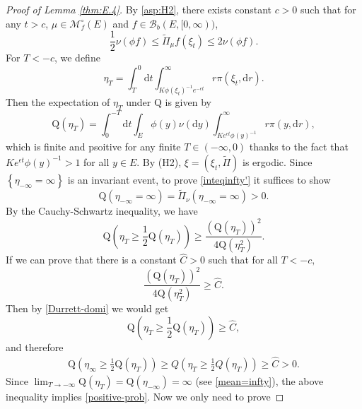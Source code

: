 \documentclass[12pt,a4paper]{amsart}
\numberwithin{equation}{section}
\theoremstyle{plain}
\theoremstyle{definition}
\theoremstyle{remark}
\begin{document}
\begin{proof}[Proof of Lemma \ref{thm:E.4}]
By  \eqref{asp:H2},
there exists constant $c>0$ such that for any $t>c$, $\mu\in\mathcal M^\circ_f(E)$ and  $f\in \mathcal B_b(E,[0,\infty))$,
\begin{equation}\label{domi-p}
 \frac{1}{2}\nu(\phi f)\leq \widetilde{\Pi}_\mu f(\xi_t)\leq 2\nu(\phi f).
\end{equation}
For $T<-c$, we define
$$
 \eta_T=\int_{T}^0 \mathrm dt\int_{K\phi(\xi_t)^{-1}e^{-\epsilon t}}^\infty r\pi(\xi_t, \mathrm dr).
$$
Then the expectation of $\eta_T$ under $\mathrm Q$ is given by
$$
 \mathrm Q(\eta_T)=\int_0^{-T}\mathrm dt\int_E\phi(y)\nu(\mathrm dy)\int_{K e^{\epsilon t}\phi(y)^{-1}}^\infty r\pi(y, \mathrm dr),
$$
which is finite and psoitive  for any finite $T\in (-\infty, 0)$
thanks to the fact that $K e^{\epsilon t}\phi(y)^{-1}>1$ for all $y\in E$. 
By (H2), $\xi=(\xi_t, \widetilde \Pi)$ is ergodic. Since $\left\{\eta_{-\infty}=\infty\right\}$ is an invariant event, 
to prove \eqref{inteqinfty'}  it suffices to show
\begin{equation}\label{positive-prob}
\mathrm Q\left(\eta_{-\infty}=\infty\right)=\widetilde{\Pi}_\nu\left(\eta_{-\infty}=\infty\right)>0.
\end{equation}
By  the Cauchy-Schwartz inequality, we have
\begin{equation}\label{Durrett-domi}
\mathrm Q\left(\eta_T\geq \frac{1}{2}\mathrm Q(\eta_T)\right)\geq \frac{(\mathrm Q(\eta_T))^2}{4\mathrm Q(\eta_T^2)}.
\end{equation}
If we can prove that there is a constant $\widehat C>0$ such that
for all $T<-c,$
\begin{equation}\label{uniform lower bound}
\dfrac{(\mathrm Q(\eta_T))^2}{4\mathrm Q(\eta_T^2)}\geq \widehat C.
\end{equation}
Then by \eqref{Durrett-domi} we would get
$$
\mathrm Q\left(\eta_T\geq \frac{1}{2}\mathrm Q(\eta_T)\right)\geq \widehat C,
$$
and therefore
\begin{eqnarray*}
\mathrm Q\left(\eta_\infty\geq \frac{1}{2}\mathrm Q(\eta_T)\right)\geq Q\left(\eta_T\geq \frac{1}{2}Q(\eta_T)\right)\ge\widehat C>0.
\end{eqnarray*}
Since $\lim_{T\rightarrow-\infty}\mathrm Q(\eta_T)=\mathrm Q(\eta_{-\infty})=\infty$ (see \eqref{mean=infty}), the above inequality implies
\eqref{positive-prob}.  Now we only need to prove

\end{proof}
\end{document}
